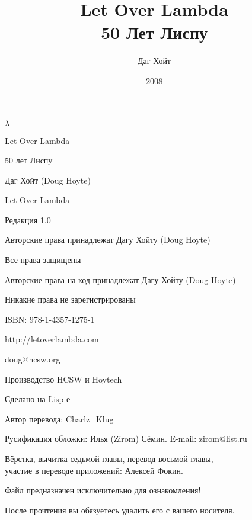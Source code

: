 \documentclass[a4paper, 12pt]{book}
\title{Let Over Lambda \\50 Лет Лиспу}
\date{2008}
\author{Даг Хойт}
\begin{document}
\newcommand{\listbegin} {\vspace{0.1cm}\hrule}
\newcommand{\listend} {\hrule\vspace{0.1cm}}








\renewcommand {\contentsname} {Оглавление}
\renewcommand {\chaptername} {Глава}
%
\maketitle
\begin{center}
{\LARGE $\lambda$}


Let Over Lambda

50 лет Лиспу

Даг Хойт (Doug Hoyte)

Let Over Lambda

Редакция 1.0

Авторские права принадлежат Дагу Хойту (Doug Hoyte)

Все права защищены

Авторские права на код принадлежат Дагу Хойту (Doug Hoyte)

Никакие права не зарегистрированы

ISBN: 978-1-4357-1275-1

http://letoverlambda.com

doug@hcsw.org

Производство HCSW и Hoytech

Сделано на Lisp-е

Автор перевода: Charlz\_Klug

Русификация обложки: Илья (Zirom) Сёмин. E-mail: zirom@list.ru

Вёрстка, вычитка седьмой главы, перевод восьмой главы, \\участие в переводе приложений: Алексей Фокин.

{\color{red} Файл предназначен исключительно для ознакомления!

После прочтения вы обязуетесь удалить его с вашего носителя.}
\end{center}
\tableofcontents















\newpage 

\end{document}
